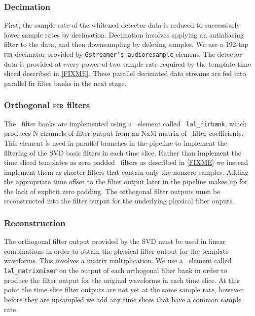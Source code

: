 \subsubsection{Decimation}

First, the sample rate of the whitened detector data is reduced to successively
lower sample rates by decimation.  Decimation involves applying an antialiasing
filter to the data, and then downsampling by deleting samples.  We use a
192-tap \textsc{fir} decimator provided by {\tt Gstreamer's audioresample}
element.  The detector data is provided at every power-of-two sample rate
required by the template time sliced described in \eqref{FIXME}.  These
parallel decimated data streams are fed into parallel fir filter banks in the
next stage.

\subsubsection{Orthogonal \textsc{fir} filters}

The \fir\ filter banks are implemented using a \gstlal\ element called {\tt
lal\_firbank}, which produces N channels of filter output from an NxM matrix of
\fir\ filter coefficients.  This element is used in parallel branches in the
pipeline to implement the filtering of the SVD basis filters in each time
slice.  Rather than implement the time sliced templates as zero padded \fir\
filters as described in \eqref{FIXME} we instead implement them as shorter
filters that contain only the nonzero samples.  Adding the appropriate time
offset to the filter output later in the pipeline makes up for the lack of
explicit zero padding.  The orthogonal filter outputs must be reconstructed
into the filter output for the underlying physical filter ouputs. 

\subsubsection{Reconstruction}

The orthogonal filter output provided by the SVD must be used in linear
combinations in order to obtain the physical filter output for the template
waveforms.  This involves a matrix multiplication.  We use a \gstlal\ element
called {\tt lal\_matrixmixer} on the output of each orthogonal filter bank in
order to produce the filter output for the original waveforms in each time
slice.  At this point the time slice filter outputs are not yet at the same
sample rate, however, before they are upsampled we add any time slices that
have a common sample rate.

